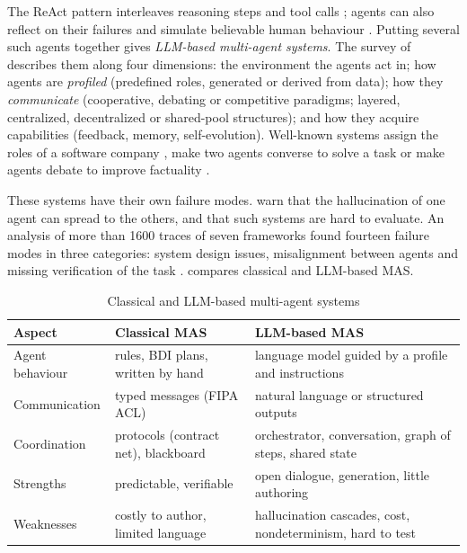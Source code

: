 The ReAct pattern interleaves reasoning steps and tool calls
\cite{yao2023react}; agents can also reflect on their failures
\cite{shinn2023} and simulate believable human behaviour
\cite{park2023}. Putting several such agents together gives
\emph{LLM-based multi-agent systems}. The survey of \citet{guo2024mas}
describes them along four dimensions: the environment the agents act in;
how agents are \emph{profiled} (predefined roles, generated or derived from
data); how they \emph{communicate} (cooperative, debating or competitive
paradigms; layered, centralized, decentralized or shared-pool structures);
and how they acquire capabilities (feedback, memory, self-evolution).
Well-known systems assign the roles of a software company
\cite{hong2024metagpt,qian2024chatdev}, make two agents converse to solve a
task \cite{li2023camel,wu2024autogen} or make agents debate to improve
factuality \cite{du2024debate}.

These systems have their own failure modes. \citet{guo2024mas} warn that
the hallucination of one agent can spread to the others, and that such
systems are hard to evaluate. An analysis of more than 1600 traces of seven
frameworks found fourteen failure modes in three categories: system design
issues, misalignment between agents and missing verification of the task
\cite{cemri2025}.  compares classical and LLM-based
MAS.

\begin{table}[htbp]
\centering
\caption{Classical and LLM-based multi-agent systems}
\label{tab-mas-compare}
\small
\begin{tabularx}{\textwidth}{@{}L{2.8cm}YY@{}}
\toprule
\textbf{Aspect} & \textbf{Classical MAS} & \textbf{LLM-based MAS} \\
\midrule
Agent behaviour & rules, BDI plans, written by hand & language model guided by a profile and instructions \\
Communication & typed messages (FIPA ACL) & natural language or structured outputs \\
Coordination & protocols (contract net), blackboard & orchestrator, conversation, graph of steps, shared state \\
Strengths & predictable, verifiable & open dialogue, generation, little authoring \\
Weaknesses & costly to author, limited language & hallucination cascades, cost, nondeterminism, hard to test \\
\bottomrule
\end{tabularx}
\end{table}

